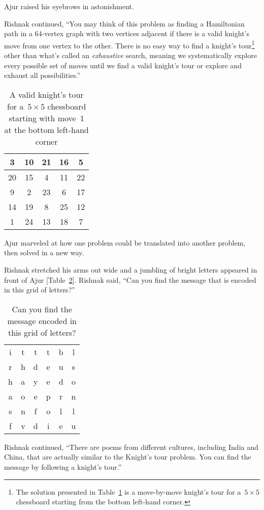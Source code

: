 Ajur raised his eyebrows in astonishment.

Rishnak continued, ``You may think of this problem as finding a Hamiltonian path in a 64-vertex graph with two vertices adjacent if there is a valid knight's move from one vertex to the other. There is no easy way to find a knight's tour\footnote{The solution presented in Table~\ref{5t1} is a move-by-move knight's tour for a~$5\times5$ chessboard starting from the bottom left-hand corner.} other than what's called an \textit{exhaustive} search, meaning we systematically explore every possible set of moves until we find a valid knight's tour or explore and exhaust all possibilities.''

\begin{table}
\centering
\begin{tabular}{|c |c |c| c| c|} 
 \hline
3&10&21&16& 5\\
\hline
20&15& 4&11&22\\
\hline
 9& 2&23& 6&17\\
 \hline
14&19& 8&25&12\\
\hline
 1&24&13&18& 7\\
 \hline
\end{tabular}
\caption{A valid knight's tour for a~$5\times5$ chessboard starting with move~1 at the bottom left-hand corner}
\label{5t1}
\end{table}

Ajur marveled at how one problem could be translated into another problem, then solved in a new way.

Rishnak stretched his arms out wide and a jumbling of bright letters appeared in front of Ajur [Table~\ref{5t2}]. Rishnak said, ``Can you find the message that is encoded in this grid of letters?''

\begin{table}
\centering
\begin{tabular}{c c c c cc}
i& t& t& t& b& l\\
r& h &d &e& u& s\\
h& a& y& e& d& o\\
a& o& e& p& r& n\\
s& n& f& o& l& l\\
f& v& d &i& e& u\\
\end{tabular}
\caption{Can you find the message encoded in this grid of letters?}
\label{5t2}
\end{table}

Rishnak continued, ``There are poems from different cultures, including India and China, that are actually similar to the Knight's tour problem. You can find the message by following a knight's tour.''


